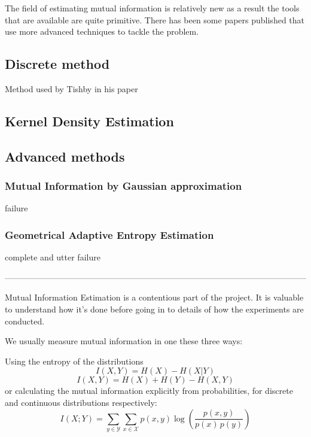 The field of estimating mutual information is relatively new as a result the
tools that are available are quite primitive. There has been some papers
published that use more advanced techniques to tackle the problem. 

\subsection{Discrete method}

  Method used by Tishby in his paper 

\subsection{Kernel Density Estimation}

\subsection{Advanced methods}
\subsubsection{Mutual Information by Gaussian approximation}
  failure
\subsubsection{Geometrical Adaptive Entropy Estimation}
  complete and utter failure



------------------------------------------------------------------------------------------------------------


Mutual Information Estimation is a contentious part of the project. It is
valuable to understand how it's done before going in to details of how the
experiments are conducted.
 
We usually measure mutual information in one these three ways:

Using the entropy of the distributions
\begin{equation}
  I(X, Y) = H(X) - H(X|Y)
\end{equation}
\begin{equation}
  I(X, Y) = H(X) + H(Y) - H(X,Y)
\end{equation}
or calculating the mutual information explicitly from probabilities, for
discrete and continuous distributions respectively:
\begin{equation}
      {I} (X;Y)=\sum _{y\in {\mathcal {Y}}}\sum _{x\in {\mathcal
      {X}}}{p(x,y)\log {\left({\frac {p(x,y)}{p(x)\,p(y)}}\right)}} 
\end{equation}


